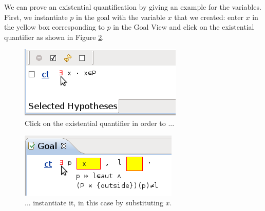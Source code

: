 
We can prove an existential quantification by giving an example for the variables. First, we
  instantiate $p$ in the goal with the variable $x$ that we created: enter $x$ in the yellow box corresponding to $p$ 
  in the \textsf{Goal View} and click on the existential quantifier as shown in Figure \ref{fig_tut_10_instantiate_p}. 

\begin{figure}[!ht]
\begin{center}
	\includegraphics{img/tutorial/tut_10_instantiate_x.png}
	\caption{Click on the existential quantifier in order to ...}
	\label{fig_tut_10_instantiate_x}
\end{center}
\end{figure}

\begin{figure}[!ht]
\begin{center}
	\includegraphics{img/tutorial/tut_10_instantiate_p.png}
	\caption{... instantiate it, in this case by substituting $x$.}
	\label{fig_tut_10_instantiate_p}
\end{center}
\end{figure}


